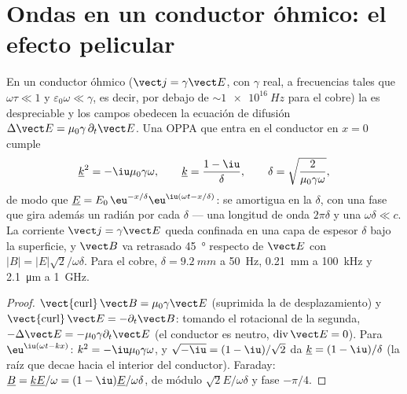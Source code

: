 \section{Ondas en un conductor óhmico: el efecto pelicular}

\begin{theorem}\label{thm:b2:waves-in-media:skin}
En un conductor óhmico ($\vect j = \gamma\vect E$, con $\gamma$ real, a frecuencias
tales que $\omega\tau \ll 1$ y $\varepsilon_0\omega \ll \gamma$, es decir, por debajo de $\sim\qty{1e16}{Hz}$ para
el cobre) la  es despreciable y los campos obedecen la
ecuación de difusión $\Delta\vect E = \mu_0\gamma\,\partial_t\vect E$. Una OPPA que entra en
el conductor en $x = 0$ cumple
\[
\underline k^2 = -\iu\mu_0\gamma\omega , \qquad \underline k = \frac{1 - \iu}\delta , \qquad
\delta = \sqrt{\frac2{\mu_0\gamma\omega}} ,
\]
de modo que $\underline E = E_0\,\eu^{-x/\delta}\eu^{\iu(\omega t - x/\delta)}$: se amortigua
en la \emph{} $\delta$, con una fase que gira además un
radián por cada $\delta$ --- una longitud de onda $2\pi\delta$ y una  $\omega\delta \ll
c$. La corriente $\vect j = \gamma\vect E$ queda confinada en una capa de espesor
$\delta$ bajo la superficie, y $\vect B$ va retrasado \qty{45}{\degree} respecto de $\vect E$ con
$|B| = |E|\sqrt2/\omega\delta$. Para el cobre, $\delta = \qty{9.2}{mm}$ a \qty{50}{Hz},
\qty{0.21}{mm} a \qty{100}{kHz} y \qty{2.1}{\micro m} a \qty{1}{GHz}.
\end{theorem}

\begin{proof}
$\operatorname{\vect{curl}}\vect B = \mu_0\gamma\vect E$ (suprimida la de desplazamiento) y
$\operatorname{\vect{curl}}\vect E = -\partial_t\vect B$: tomando el rotacional de la segunda,
$-\Delta\vect E = -\mu_0\gamma\partial_t\vect E$ (el conductor es neutro, $\operatorname{div}
\vect E = 0$). Para $\eu^{\iu(\omega t - kx)}$: $k^2 = -\iu\mu_0\gamma\omega$, y
$\sqrt{-\iu} = (1 - \iu)/\sqrt2$ da $\underline k = (1 - \iu)/\delta$ (la raíz que
decae hacia el interior del conductor). Faraday: $\underline B = \underline k\underline E/\omega = (1 - \iu)
\underline E/\omega\delta$, de módulo $\sqrt2E/\omega\delta$ y fase $-\pi/4$.
\end{proof}

